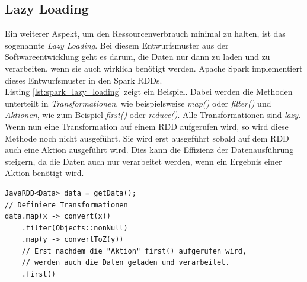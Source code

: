 \subsection*{Lazy Loading}
Ein weiterer Aspekt, um den Ressourcenverbrauch minimal zu halten, ist das sogenannte \textit{Lazy Loading}. Bei diesem Entwurfsmuster aus der Softwareentwicklung geht es darum, die Daten nur dann zu laden und zu verarbeiten, wenn sie auch wirklich benötigt werden. Apache Spark implementiert dieses Entwurfsmuster in den Spark RDDs.\cite{spark_rdd}\\
Listing \ref{lst:spark_lazy_loading} zeigt ein Beispiel. Dabei werden die Methoden unterteilt in \textit{Transformationen}, wie beispielsweise \textit{map()} oder \textit{filter()} und \textit{Aktionen}, wie zum Beispiel \textit{first()} oder \textit{reduce()}. Alle Transformationen sind \textit{lazy}. Wenn nun eine Transformation auf einem RDD aufgerufen wird, so wird diese Methode noch nicht ausgeführt. Sie wird erst ausgeführt sobald auf dem RDD auch eine Aktion ausgeführt wird. Dies kann die Effizienz der Datenausführung steigern, da die Daten auch nur verarbeitet werden, wenn ein Ergebnis einer Aktion benötigt wird.

\begin{lstlisting}[label={lst:spark_lazy_loading},caption= Lazy Loading bei Apache Spark ,captionpos=b,frame=single,style=customjava]
JavaRDD<Data> data = getData();
// Definiere Transformationen
data.map(x -> convert(x))
	.filter(Objects::nonNull)
	.map(y -> convertToZ(y))
	// Erst nachdem die "Aktion" first() aufgerufen wird,
	// werden auch die Daten geladen und verarbeitet.
	.first()
\end{lstlisting}

